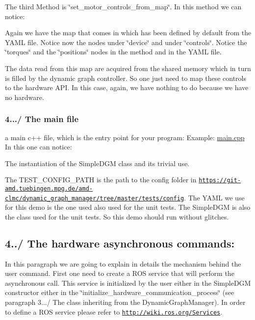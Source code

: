 The third Method is \char`\"{}set\+\_\+motor\+\_\+controls\+\_\+from\+\_\+map\char`\"{}.  In this method we can notice\+:
\begin{DoxyItemize}
\item Again we have the map that comes in which has been defined by default from the Y\+A\+ML file. Notice now the nodes under \char`\"{}device\char`\"{} and under \char`\"{}controls\char`\"{}. Notice the \char`\"{}torques\char`\"{} and the \char`\"{}positions\char`\"{} nodes in the method and in the Y\+A\+ML file.
\item The data read from this map are acquired from the shared memory which in turn is filled by the dynamic graph controller. So one just need to map these controls to the hardware A\+PI. In this case, again, we have nothing to do because we have no hardware.
\end{DoxyItemize}\hypertarget{subsubpage_implement_dgm_dgm_impl_sec_main}{}\subsubsection{4.../ The main file}\label{subsubpage_implement_dgm_dgm_impl_sec_main}
a main c++ file, which is the entry point for your program\+: Example\+: \hyperlink{main_8cpp}{main.\+cpp}  In this one can notice\+:
\begin{DoxyItemize}
\item The instantiation of the Simple\+D\+GM class and its trivial use.
\item The T\+E\+S\+T\+\_\+\+C\+O\+N\+F\+I\+G\+\_\+\+P\+A\+TH is the path to the config folder in \href{https://git-amd.tuebingen.mpg.de/amd-clmc/dynamic_graph_manager/tree/master/tests/config}{\tt https\+://git-\/amd.\+tuebingen.\+mpg.\+de/amd-\/clmc/dynamic\+\_\+graph\+\_\+manager/tree/master/tests/config}. The Y\+A\+ML we use for this demo is the one used also used for the unit tests. The Simple\+D\+GM is also the class used for the unit tests. So this demo should run without glitches.
\end{DoxyItemize}\hypertarget{subsubpage_implement_dgm_dgm_impl_sec_hwc_commands}{}\subsection{4../ The hardware asynchronous commands\+:}\label{subsubpage_implement_dgm_dgm_impl_sec_hwc_commands}
In this paragraph we are going to explain in details the mechanism behind the user command. First one need to create a R\+OS service that will perform the asynchronous call. This service is initialized by the user either in the Simple\+D\+GM constructor either in the \char`\"{}initialize\+\_\+hardware\+\_\+communication\+\_\+process\char`\"{} (see paragraph 3.../ The class inheriting from the Dynamic\+Graph\+Manager). In order to define a R\+OS service please refer to \href{http://wiki.ros.org/Services}{\tt http\+://wiki.\+ros.\+org/\+Services}.

